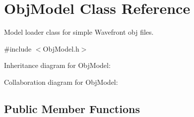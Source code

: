 \hypertarget{class_obj_model}{}\section{Obj\+Model Class Reference}
\label{class_obj_model}


Model loader class for simple Wavefront obj files.  




{\ttfamily \#include $<$Obj\+Model.\+h$>$}



Inheritance diagram for Obj\+Model\+:


Collaboration diagram for Obj\+Model\+:
\subsection*{Public Member Functions}
